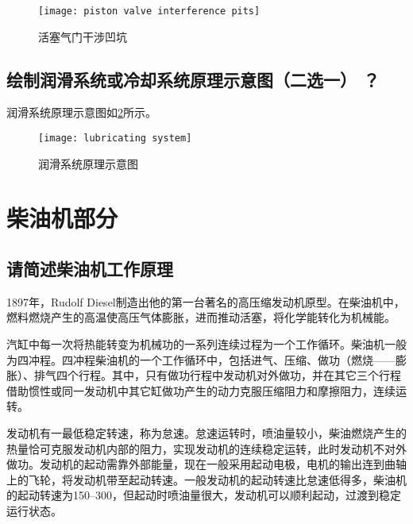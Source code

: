 \documentclass[UTF8]{ctexart}
\numberwithin{figure}{section}
\numberwithin{table}{section}
\begin{document}
\begin{figure}[htbp]
	\centering
	\begin{minipage}[b]{0.4\textwidth}
		\centering
		\texttt{[image: piston valve interference pits]}
		\caption{活塞气门干涉凹坑}
		\label{piston valve interference pits}
	\end{minipage}
\end{figure}

\subsection{绘制润滑系统或冷却系统原理示意图（二选一） ？}

润滑系统原理示意图如\cref{lubricating system}所示。

\begin{figure}[htbp]
	\centering
	\begin{minipage}[b]{\textwidth}
		\centering
		\texttt{[image: lubricating system]}
		\caption{润滑系统原理示意图}
		\label{lubricating system}
	\end{minipage}
\end{figure}

\clearpage

\section{柴油机部分}
\subsection{请简述柴油机工作原理}

1897年，Rudolf Diesel制造出他的第一台著名的高压缩发动机原型。在柴油机中，燃料燃烧产生的高温使高压气体膨胀，进而推动活塞，将化学能转化为机械能。

汽缸中每一次将热能转变为机械功的一系列连续过程为一个工作循环。柴油机一般为四冲程。四冲程柴油机的一个工作循环中，包括进气、压缩、做功（燃烧——膨胀）、排气四个行程。其中，只有做功行程中发动机对外做功，并在其它三个行程借助惯性或同一发动机中其它缸做功产生的动力克服压缩阻力和摩擦阻力，连续运转。

发动机有一最低稳定转速，称为怠速。怠速运转时，喷油量较小，柴油燃烧产生的热量恰可克服发动机内部的阻力，实现发动机的连续稳定运转，此时发动机不对外做功。发动机的起动需靠外部能量，现在一般采用起动电极，电机的输出连到曲轴上的飞轮，将发动机带至起动转速。一般发动机的起动转速比怠速低得多，柴油机的起动转速为\qtyrange[range-phrase = $\,\sim\,$, range-units = single]{150}{300}{\rpm}，但起动时喷油量很大，发动机可以顺利起动，过渡到稳定运行状态。
\end{document}
